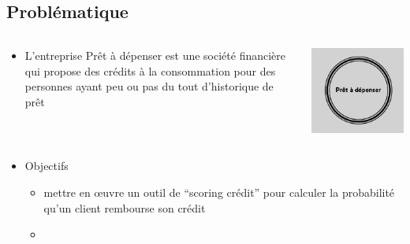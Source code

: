 \documentclass[8pt,aspectratio=169,hyperref={unicode=true}]{beamer}
\begin{document}
\subsection{Problématique}
\begin{frame}{\insertsubsection}
    \begin{columns}
        \begin{column}{.8\textwidth}
            \begin{itemize}
                \item L'entreprise Prêt à dépenser est une société financière qui propose des crédits à la consommation pour des personnes ayant peu ou pas du tout d'historique de prêt
            \end{itemize}
        \end{column}
        \begin{column}{.2\textwidth}
            \includegraphics[width=\textwidth]{./logoPAD.png}
        \end{column}
    \end{columns}
    \begin{itemize}
        \item Objectifs
              \begin{itemize}
                  \item mettre en œuvre un outil de “scoring crédit” pour calculer la probabilité qu’un client rembourse son crédit
                  \item[]

\end{itemize}
\end{itemize}
\end{frame}
\end{document}
